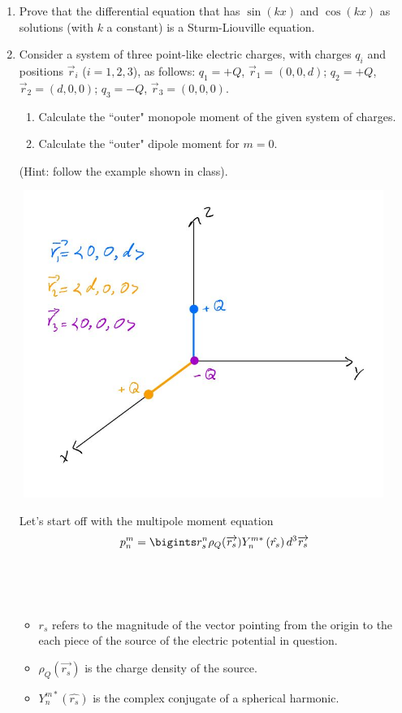 \documentclass[fleqn]{article}
\begin{document}
\begin{enumerate}
    \item Prove that the differential equation that has $\sin( k x)$ and $\cos(k x)$ as solutions (with $k$ a constant) is a Sturm-Liouville equation. 
    
    
    \item Consider a system of three point-like electric charges, with charges $q_i$ and positions $\vec r_i$ ($i=1,2,3$), as follows:
    $q_1=+Q$, $\vec r_1=(0,0,d)$; $q_2=+Q$, $\vec r_2=(d,0,0)$; $q_3=-Q$, $\vec r_3=(0,0,0)$.   
    
    \begin{enumerate}
      \item Calculate the ``outer" monopole moment of the given system of charges. 
      
      \item Calculate the ``outer" dipole moment for $m=0$. 
    
    \end{enumerate}
    (Hint: follow the example shown in class). 

    \includegraphics[height=10cm, width=12cm]{One.JPG}

      \textcolor{hwColor}{
        Let's start off with the multipole moment equation 
        $$p^m_n=\bigints r^n_s \rho_Q(\overrightarrow{r_s}) Y^{m*}_n \left(\hat{r_s}\right) d^3 \overrightarrow{r_s}$$ \\
        \\
        \\
        \begin{itemize}
          \item $r_s$ refers to the magnitude of the vector pointing from the origin to the each piece of the source of the
          electric potential in question. 
          \item $\rho_Q(\overrightarrow{r_s})$ is the charge density of the source.
          \item $Y^{m*}_n \left(\hat{r_s}\right)$ is the complex conjugate of a spherical harmonic. 
        \end{itemize}
      }


\end{enumerate}
\end{document}

